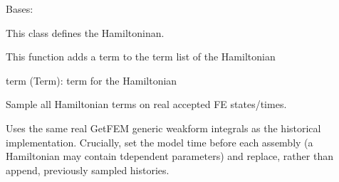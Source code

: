 \documentclass[letterpaper,10pt,english]{sphinxmanual}
\begin{document}
\begin{fulllineitems}
\label{\detokenize{scrimp:scrimp.hamiltonian.Hamiltonian}}
\pysigstartsignatures
\pysiglinewithargsret
{}
{}
{}
\pysigstopsignatures
\sphinxAtStartPar
Bases: 

\sphinxAtStartPar
This class defines the Hamiltoninan.

\begin{fulllineitems}
\label{\detokenize{scrimp:scrimp.hamiltonian.Hamiltonian.add_term}}
\pysigstartsignatures
\pysiglinewithargsret
{}
{}
{}
\pysigstopsignatures
\sphinxAtStartPar
This function adds a term to the term list of the Hamiltonian
\begin{description}
\sphinxAtStartPar
term (Term): term for the Hamiltonian

\end{description}

\end{fulllineitems}


\begin{fulllineitems}
\label{\detokenize{scrimp:scrimp.hamiltonian.Hamiltonian.compute}}
\pysigstartsignatures
\pysiglinewithargsret
{}
{\sphinxparamcomma {}\sphinxparamcomma {}}
{}
\pysigstopsignatures
\sphinxAtStartPar
Sample all Hamiltonian terms on real accepted FE states/times.

\sphinxAtStartPar
Uses the same real GetFEM generic weak\sphinxhyphen{}form integrals as the
historical implementation. Crucially, set the model time before
each assembly (a Hamiltonian may contain t\sphinxhyphen{}dependent parameters)
and replace, rather than append, previously sampled histories.


\end{fulllineitems}
\end{fulllineitems}
\end{document}
